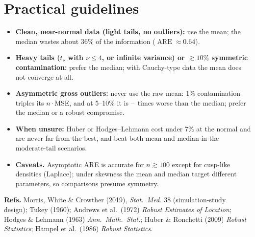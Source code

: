 \documentclass[10pt,a4paper]{article}
\newcommand{\ARE}{\operatorname{ARE}}
\begin{document}
\begin{table}[H]
\centering\footnotesize\setlength{\tabcolsep}{5pt}
\caption{$n\cdot\mathrm{MSE}$ about $\theta=0$ at $n=100$ ($B=\Bcomp$; Monte Carlo error about 1\%). Lowest in bold (ties at printed precision share it). The mean has no finite MSE for Cauchy data.}
\label{tab:comp}

\end{table}

\section{Practical guidelines}
\begin{itemize}
\item \textbf{Clean, near-normal data (light tails, no outliers):} use the mean; the median wastes about 36\% of the information ($\ARE\approx0.64$).
\item \textbf{Heavy tails ($t_\nu$ with $\nu\le4$, or infinite variance) or $\gtrsim10\%$ symmetric contamination:} prefer the median; with Cauchy-type data the mean does not converge at all.
\item \textbf{Asymmetric gross outliers:} never use the raw mean: 1\% contamination triples its $n\cdot$MSE, and at 5--10\% it is \ratioShiftFive--\ratioShiftTen\ times worse than the median; prefer the median or a robust compromise.
\item \textbf{When unsure:} Huber or Hodges--Lehmann cost under 7\% at the normal and are never far from the best, and beat both mean and median in the moderate-tail scenarios.
\item \textbf{Caveats.} Asymptotic ARE is accurate for $n\gtrsim100$ except for cusp-like densities (Laplace); under skewness the mean and median target different parameters, so comparisons presume symmetry.
\end{itemize}
{\footnotesize\color{ink2}\textbf{Refs.} Morris, White \& Crowther (2019), \emph{Stat.\ Med.} 38 (simulation-study design); Tukey (1960); Andrews et al.\ (1972) \emph{Robust Estimates of Location}; Hodges \& Lehmann (1963) \emph{Ann.\ Math.\ Stat.}; Huber \& Ronchetti (2009) \emph{Robust Statistics}; Hampel et al.\ (1986) \emph{Robust Statistics}.}
\end{document}
